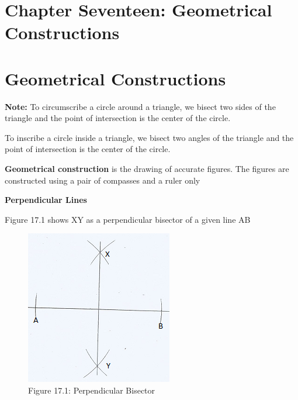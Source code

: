 \documentclass[
  a4paperpaper,
]{scrbook}
\begin{document}

\chapter{Chapter Seventeen: Geometrical
Constructions}\label{chapter-seventeen-geometrical-constructions}


\chapter*{Geometrical Constructions}\label{geometrical-constructions}


\textbf{Note:} To circumscribe a circle around a triangle, we bisect two
sides of the triangle and the point of intersection is the center of the
circle.

To inscribe a circle inside a triangle, we bisect two angles of the
triangle and the point of intersection is the center of the circle.

\textbf{Geometrical construction} is the drawing of accurate figures.
The figures are constructed using a pair of compasses and a ruler only

\textbf{Perpendicular Lines}

Figure 17.1 shows XY as a perpendicular bisector of a given line AB

\begin{figure}[H]

{\centering \includegraphics{figures/Images/FIG1.png}

}

\caption{Figure 17.1: Perpendicular Bisector}

\end{figure}%
\end{document}
